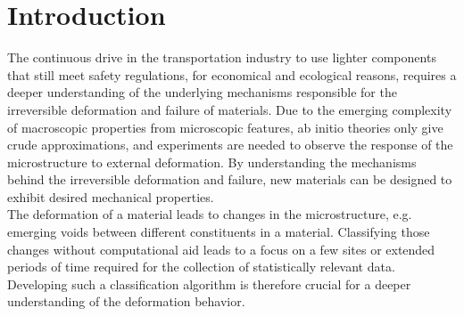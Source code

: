 \chapter{Introduction}

The continuous drive in the transportation industry to use lighter components that still meet safety regulations, for economical and ecological reasons, requires a deeper understanding of the underlying mechanisms responsible for the irreversible deformation and failure of materials. Due to the emerging complexity of macroscopic properties from microscopic features, ab initio theories only give crude approximations, and experiments are needed to observe the response of the microstructure to external deformation. By understanding the mechanisms behind the irreversible deformation and failure, new materials can be designed to exhibit desired mechanical properties.\\



The deformation of a material leads to changes in the microstructure, e.g. emerging voids between different constituents in a material. Classifying those changes without computational aid leads to a focus on a few sites or extended periods of time required for the collection of statistically relevant data. Developing such a classification algorithm is therefore crucial for a deeper understanding of the deformation behavior. \\

